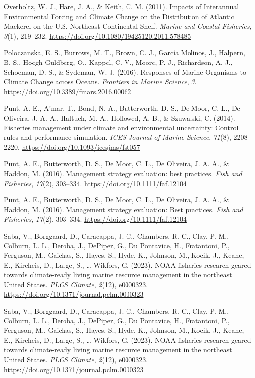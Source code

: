 \documentclass[
  12pt,
]{article}
\newlength{\cslhangindent}
\newenvironment{CSLReferences}[2] %
 {\begin{list}{}{%
  \setlength{\itemindent}{0pt}
  \setlength{\leftmargin}{0pt}
  \setlength{\parsep}{0pt}
  \ifodd #1
   \setlength{\leftmargin}{\cslhangindent}
   \setlength{\itemindent}{-1\cslhangindent}
  \fi
  \setlength{\itemsep}{#2\baselineskip}}}
 {\end{list}}
\begin{document}
\begin{CSLReferences}{1}{2}
Overholtz, W. J., Hare, J. A., \& Keith, C. M. (2011). Impacts of Interannual Environmental Forcing and Climate Change on the Distribution of Atlantic Mackerel on the U.S. Northeast Continental Shelf. \emph{Marine and Coastal Fisheries}, \emph{3}(1), 219--232. \url{https://doi.org/10.1080/19425120.2011.578485}

Poloczanska, E. S., Burrows, M. T., Brown, C. J., García Molinos, J., Halpern, B. S., Hoegh-Guldberg, O., Kappel, C. V., Moore, P. J., Richardson, A. J., Schoeman, D. S., \& Sydeman, W. J. (2016). Responses of Marine Organisms to Climate Change across Oceans. \emph{Frontiers in Marine Science}, \emph{3}. \url{https://doi.org/10.3389/fmars.2016.00062}

Punt, A. E., A'mar, T., Bond, N. A., Butterworth, D. S., De Moor, C. L., De Oliveira, J. A. A., Haltuch, M. A., Hollowed, A. B., \& Szuwalski, C. (2014). Fisheries management under climate and environmental uncertainty: Control rules and performance simulation. \emph{ICES Journal of Marine Science}, \emph{71}(8), 2208--2220. \url{https://doi.org/10.1093/icesjms/fst057}

Punt, A. E., Butterworth, D. S., De Moor, C. L., De Oliveira, J. A. A., \& Haddon, M. (2016). Management strategy evaluation: best practices. \emph{Fish and Fisheries}, \emph{17}(2), 303--334. \url{https://doi.org/10.1111/faf.12104}

Punt, A. E., Butterworth, D. S., De Moor, C. L., De Oliveira, J. A. A., \& Haddon, M. (2016). Management strategy evaluation: Best practices. \emph{Fish and Fisheries}, \emph{17}(2), 303--334. \url{https://doi.org/10.1111/faf.12104}

Saba, V., Borggaard, D., Caracappa, J. C., Chambers, R. C., Clay, P. M., Colburn, L. L., Deroba, J., DePiper, G., Du Pontavice, H., Fratantoni, P., Ferguson, M., Gaichas, S., Hayes, S., Hyde, K., Johnson, M., Kocik, J., Keane, E., Kircheis, D., Large, S., \ldots{} Wikfors, G. (2023). {NOAA} fisheries research geared towards climate-ready living marine resource management in the northeast {United States}. \emph{PLOS Climate}, \emph{2}(12), e0000323. \url{https://doi.org/10.1371/journal.pclm.0000323}

Saba, V., Borggaard, D., Caracappa, J. C., Chambers, R. C., Clay, P. M., Colburn, L. L., Deroba, J., DePiper, G., Du Pontavice, H., Fratantoni, P., Ferguson, M., Gaichas, S., Hayes, S., Hyde, K., Johnson, M., Kocik, J., Keane, E., Kircheis, D., Large, S., \ldots{} Wikfors, G. (2023). NOAA fisheries research geared towards climate-ready living marine resource management in the northeast United States. \emph{PLOS Climate}, \emph{2}(12), e0000323. \url{https://doi.org/10.1371/journal.pclm.0000323}


\end{CSLReferences}
\end{document}
